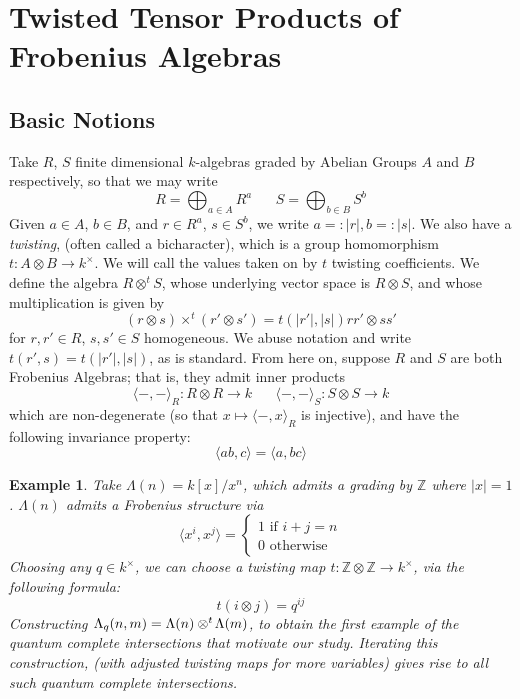\documentclass{article}
\newcommand{\twisten}{\otimes^t\hspace{-1pt}}
\theoremstyle{plain}
\newtheorem{examples}[theorem]{Example}
\theoremstyle{definition}
\begin{document}
  \section{Twisted Tensor Products of Frobenius Algebras}
\subsection{Basic Notions} Take $R$, $S$ finite dimensional $k$-algebras graded by Abelian Groups $A$ and $B$ respectively, so that we may write
$$R = \bigoplus_{a\in A} R^a \hspace{20pt} S = \bigoplus_{b \in B} S^b$$
Given $a \in A$, $b \in B$, and $r \in R^a$, $s \in S^b$, we write $a=:|r|, b=:|s|$. We also have a \emph{twisting}, (often called a bicharacter), which is a group homomorphism $t: A \otimes B \rightarrow k^{\times}$. We will call the values taken on by $t$ twisting coefficients. We define the algebra $R \otimes^t S$, whose underlying vector space is $R \otimes S$, and whose multiplication is given by 
$$(r \otimes s) \times^t (r' \otimes s') = t(|r'|,|s|) rr'\otimes ss'$$
for $r,r' \in R$, $s,s' \in S$ homogeneous. We abuse notation and write $t(r',s) = t(|r'|, |s|)$, as is standard. From here on, suppose $R$ and $S$ are both Frobenius Algebras; that is, they admit inner products
$$\langle -, - \rangle_R : R \otimes R \rightarrow k \hspace{20pt}\langle -, - \rangle_S : S \otimes S \rightarrow k$$
which are non-degenerate (so that $ x\mapsto \langle -,  x \rangle_{R}$ is injective), and have the following invariance property:
$$\langle ab, c \rangle = \langle a, bc \rangle$$ 
\begin{examples} 
Take $\Lambda(n) = k[x]/x^n$, which admits a grading by $\mathbb{Z}$ where $|x|=1$. $\Lambda(n)$ admits a Frobenius structure via
$$\langle x^i, x^j \rangle = \begin{cases} 1 \textrm{ if } i+j=n \\ 0 \textrm{ otherwise } \end{cases}$$
Choosing any $q \in k^\times$, we can choose a twisting map $t:\mathbb{Z} \otimes \mathbb{Z} \rightarrow k^\times$,  via the following formula:
$$t(i\otimes j) = q^{ij}$$
Constructing $\Lambda_q(n,m) = \Lambda(n) \twisten \Lambda(m)$, to obtain the first example of the \emph{quantum complete intersections} that motivate our study. Iterating this construction, (with adjusted twisting maps for more variables) gives rise to all such quantum complete intersections.
\end{examples}
\end{document}
